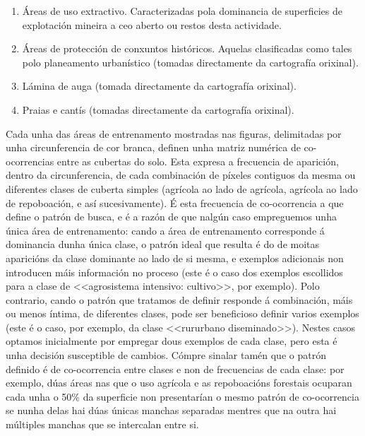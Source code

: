 \documentclass[11pt,a4paper]{article}
\begin{document}
\begin{enumerate}
 \item Áreas de uso extractivo. Caracterizadas pola dominancia de superficies de explotación mineira a ceo aberto ou restos desta actividade.
 \item Áreas de protección de conxuntos históricos. Aquelas clasificadas como tales polo planeamento urbanístico (tomadas directamente da cartografía orixinal).
 \item Lámina de auga (tomada directamente da cartografía orixinal).
 \item Praias e cantís (tomadas directamente da cartografía orixinal).
\end{enumerate}


Cada unha das áreas de entrenamento mostradas nas figuras, delimitadas por unha circunferencia de cor branca, definen unha matriz numérica de co-ocorrencias entre as cubertas do solo. Esta expresa a frecuencia de aparición, dentro da circunferencia, de cada combinación de píxeles contiguos da mesma ou diferentes clases de cuberta simples (agrícola ao lado de agrícola, agrícola ao lado de repoboación, e así sucesivamente). É esta frecuencia de co-ocorrencia a que define o patrón de busca, e é a razón de que nalgún caso empreguemos unha única área de entrenamento: cando a área de entrenamento corresponde á dominancia dunha única clase, o patrón ideal que resulta é do de moitas aparicións da clase dominante ao lado de si mesma, e exemplos adicionais non introducen máis información no proceso (este é o caso dos exemplos escollidos para a clase de <<agrosistema intensivo: cultivo>>, por exemplo). Polo contrario, cando o patrón que tratamos de definir responde á combinación, máis ou menos íntima, de diferentes clases, pode ser beneficioso definir varios exemplos (este é o caso, por exemplo, da clase <<rururbano diseminado>>). Nestes casos optamos inicialmente por empregar dous exemplos de cada clase, pero esta é unha decisión susceptible de cambios. Cómpre sinalar tamén que o patrón definido é de co-ocorrencia entre clases e non de frecuencias de cada clase: por exemplo, dúas áreas nas que o uso agrícola e as repoboacións forestais ocuparan cada unha o 50\% da superficie non presentarían o mesmo patrón de co-ocorrencia se nunha delas hai dúas únicas manchas separadas mentres que na outra hai múltiples manchas que se intercalan entre si.
\end{document}
